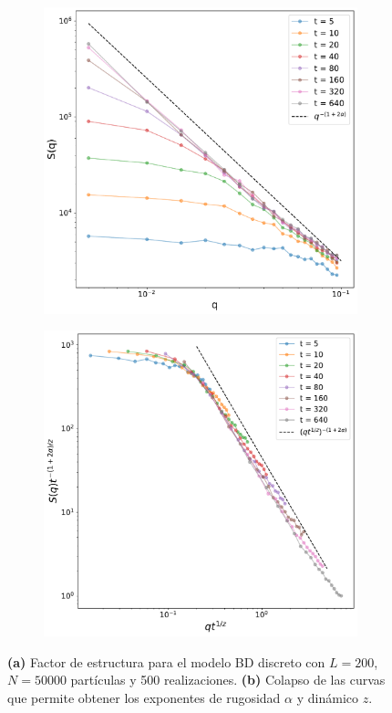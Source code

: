 \begin{figure}[!b]
    \hspace*{-1cm}
    \begin{subfigure}{.55\textwidth}
      \centering
      \includegraphics[width=\textwidth]{Sq.pdf}
      \caption{}
    \end{subfigure}
    \begin{subfigure}{.55\textwidth}
      \centering
      \includegraphics[width=\textwidth]{Sq_colapse.pdf}
      \caption{}
    \end{subfigure}
    \caption[Factor de estructura del modelo BD discreto.]{\textbf{(a)} Factor de estructura para el modelo BD discreto con $L=200$, $N=50000$ partículas y 500 realizaciones. \textbf{(b)} Colapso de las curvas que permite obtener los exponentes de rugosidad $\alpha$ y dinámico $z$.}
    \label{fig:structure_factor}
\end{figure}

